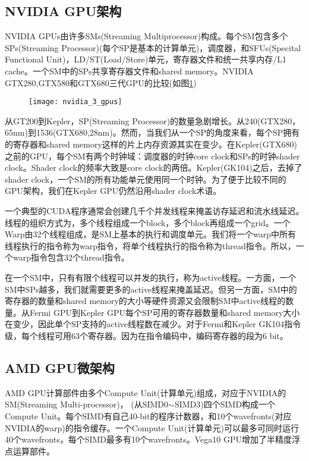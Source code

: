 \subsection{NVIDIA GPU架构}
NVIDIA GPUs由许多SMs(Streaming Multiprocessor)构成。每个SM包含多个SPs(Streaming Processor)(每个SP是基本的计算单元)，调度器，和SFUs(Specital Functional Unit)，LD/ST(Load/Store)单元，寄存器文件和统一共享内存/L1 cache。一个SM中的SPs共享寄存器文件和shared memory。NVIDIA GTX280,GTX580和GTX680三代GPU的比较(如图\ref{fig:nvidia_3_gpus})
\begin{figure}[htbp]
	\centering
	\texttt{[image: nvidia\_3\_gpus]}
	\label{fig:nvidia_3_gpus}
\end{figure}
从GT200到Kepler，SP(Streaming Processor)的数量急剧增长。从240(GTX280，65nm)到1536(GTX680,28nm)。然而，当我们从一个SP的角度来看，每个SP拥有的寄存器和shared memory这样的片上内存资源其实在变少。在Kepler(GTX680)之前的GPU，每个SM有两个时钟域：调度器的时钟core clock和SPs的时钟shader clock。Shader clock的频率大致是core clock的两倍。Kepler(GK104)之后，去掉了shader clock，一个SM的所有功能单元使用同一个时钟。为了便于比较不同的GPU架构，我们在Kepler GPU仍然沿用shader clock术语。

一个典型的CUDA程序通常会创建几千个并发线程来掩盖访存延迟和流水线延迟。线程的组织方式为，多个线程组成一个block，多个block再组成一个grid。一个Warp由32个线程组成，是SM上基本的执行和调度单元。我们将一个warp中所有线程执行的指令称为warp指令，将单个线程执行的指令称为thread指令。所以，一个warp指令包含32个thread指令。

在一个SM中，只有有限个线程可以并发的执行，称为active线程。一方面，一个SM中SPs越多，我们就需要更多的active线程来掩盖延迟。但另一方面，SM中的寄存器的数量和shared memory的大小等硬件资源又会限制SM中active线程的数量。从Fermi GPU到Kepler GPU每个SP可用的寄存器数量和shared memory大小在变少，因此单个SP支持的active线程数在减少。对于Fermi和Kepler GK104指令级，每个线程可用63个寄存器。因为在指令编码中，编码寄存器的段为6 bit。

\subsection{AMD GPU微架构}
 AMD GPU计算部件由多个Compute Unit(计算单元)组成，对应于NVIDIA的SM(Streaming Multi-processor)， (从SIMD0$\sim$SIMD3)四个SIMD构成一个Compute Unit。每个SIMD有自己40-bit的程序计数器，和10个wavefronts(对应NVIDIA的warp)的指令缓存。一个Compute Unit(计算单元)可以最多可同时运行40个wavefronts，每个SIMD最多有10个wavefronts。Vega10 GPU增加了半精度浮点运算部件。



